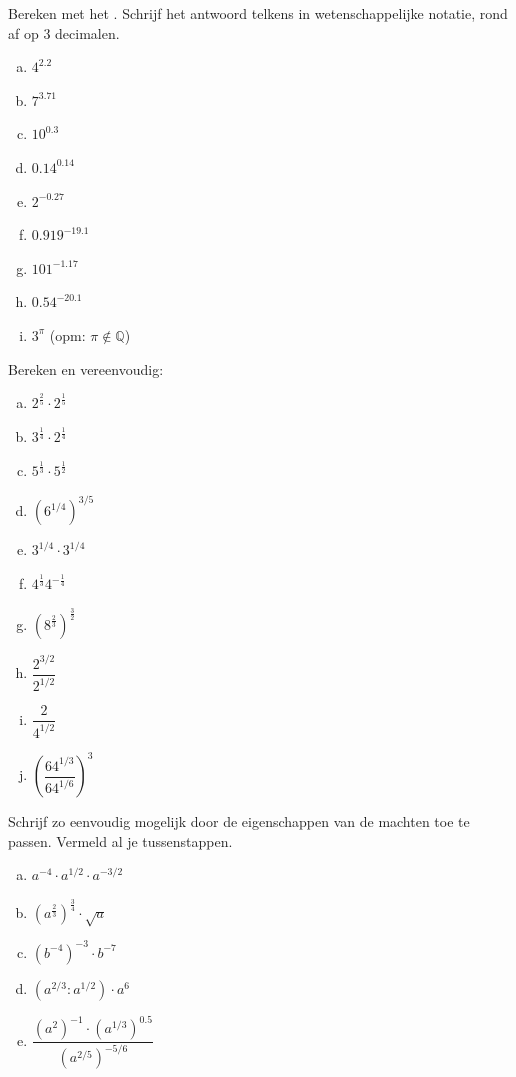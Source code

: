 \documentclass[12pt,twoside]{article}
\begin{document}
\begin{oefening}
Bereken met het . Schrijf het antwoord telkens in wetenschappelijke notatie, rond af op 3 decimalen.
\begin{multicols}{3}
\begin{enumerate}[(a)]
  \itemsep1em
  \item ${4}^{2.2}$
  \item ${7}^{3.71}$
  \item ${10}^{0.3}$
  \item ${0.14}^{0.14}$
  \item ${2}^{-0.27}$
  \item ${0.919}^{-19.1}$
  \item ${101}^{-1.17}$
  \item ${0.54}^{-20.1}$
  \item $3^\pi$ (opm: $\pi\notin\mathbb{Q}$)
\end{enumerate}
\end{multicols}
\end{oefening}

\begin{oefening}
Bereken en vereenvoudig:
\begin{multicols}{3}
\begin{enumerate}[(a)]
  \itemsep1em
  \item $2^\frac{2}{5}\cdot2^\frac{1}{5}$
  \item $3^\frac{1}{4}\cdot 2^\frac{1}{4}$
  \item $5^\frac{1}{3}\cdot 5^\frac{1}{2}$
  \item $\left(6^{1/4}\right)^{3/5}$
  \item $3^{1/4}\cdot 3^{1/4}$
  \item $4^\frac{1}{3}4^{-\frac{1}{4}}$
  \item $\left(8^\frac{2}{3}\right)^\frac{3}{2}$
  \item $\dfrac{2^{3/2}}{2^{1/2}}$
  \item $\dfrac{2}{4^{1/2}}$
  \item $\left(\dfrac{64^{1/3}}{64^{1/6}}\right)^3$
\end{enumerate}
\end{multicols}
\end{oefening}

\begin{oefening}
Schrijf zo eenvoudig mogelijk door de eigenschappen van de machten toe te passen. Vermeld al je tussenstappen.
\begin{multicols}{2}
\begin{enumerate}[(a)]
  \itemsep1em
  \item $a^{-4}\cdot a^{1/2}\cdot a^{-3/2}$
  \item $\left(a^{\frac{2}{3}}\right)^{\frac{3}{4}}\cdot \sqrt{a}$
  \item $\left(b^{-4}\right)^{-3}\cdot b^{-7}$
  \item $\left(a^{2/3}:a^{1/2}\right)\cdot a^6$
  \item $\dfrac{\left(a^2\right)^{-1}\cdot\left(a^{1/3}\right)^{0.5}}{\left(a^{2/5}\right)^{-5/6}}$
\end{enumerate}
\end{multicols}
\end{oefening}
\end{document}

